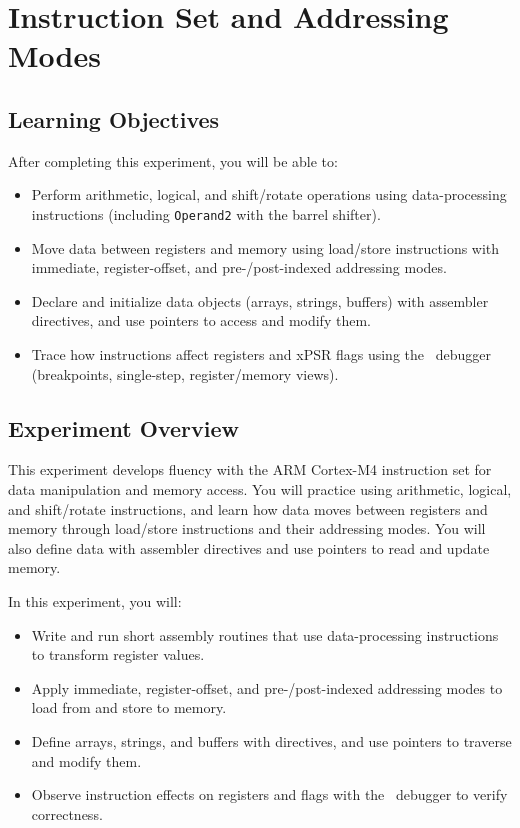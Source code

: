 \chapter{Instruction Set and Addressing Modes}
\section*{Learning Objectives}
After completing this experiment, you will be able to:
\begin{itemize}[nosep]
  \item Perform arithmetic, logical, and shift/rotate operations using data-processing instructions (including \texttt{Operand2} with the barrel shifter).
  \item Move data between registers and memory using load/store instructions with immediate, register-offset, and pre-/post-indexed addressing modes.
  \item Declare and initialize data objects (arrays, strings, buffers) with assembler directives, and use pointers to access and modify them.
  \item Trace how instructions affect registers and xPSR flags using the \keil\ debugger (breakpoints, single-step, register/memory views).
\end{itemize}
\section*{Experiment Overview}
This experiment develops fluency with the ARM Cortex-M4 instruction set for data manipulation and memory access. 
You will practice using arithmetic, logical, and shift/rotate instructions, and learn how data moves between registers and memory through load/store instructions and their addressing modes. 
You will also define data with assembler directives and use pointers to read and update memory.

\noindent In this experiment, you will:
\begin{itemize}[nosep]
  \item Write and run short assembly routines that use data-processing instructions to transform register values.
  \item Apply immediate, register-offset, and pre-/post-indexed addressing modes to load from and store to memory.
  \item Define arrays, strings, and buffers with directives, and use pointers to traverse and modify them.
  \item Observe instruction effects on registers and flags with the \keil\ debugger to verify correctness.
\end{itemize}

